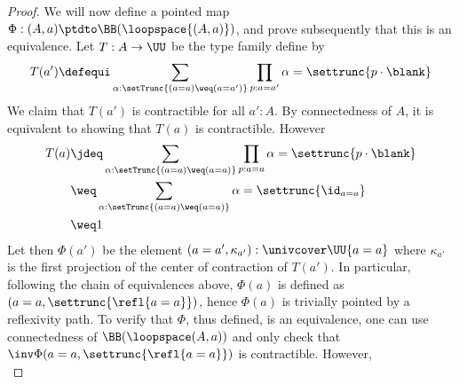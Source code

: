 \begin{proof}
  We will now define a pointed map
  $\Phi : (A,a) \ptdto \BB (\loopspace {(A,a)})$, and prove
  subsequently that this is an equivalence. Let $T : A \to \UU$ be the
  type family define by
  \begin{displaymath}
    T(a') \defequi \sum_{\alpha:\setTrunc{(a=a)\weq(a=a')}}
    \prod_{p:a=a'}\alpha=\settrunc {p\cdot\blank}
  \end{displaymath}
  We claim that $T(a')$ is contractible for all $a':A$. By
  connectedness of $A$, it is equivalent to showing that $T(a)$ is
  contractible. However
  \begin{align*}
    T(a)
    &\jdeq \sum_{\alpha:\setTrunc{(a=a)\weq(a=a)}}\prod_{p:a=a}
      \alpha = \settrunc {p\cdot \blank}
    \\
    &\weq \sum_{\alpha:\setTrunc{(a=a)\weq(a=a)}} \alpha = \settrunc{\id_{a=a}}
    \\
    &\weq 1
  \end{align*}
  Let then $\Phi (a')$ be the element
  $(a=a', \kappa_{a'}):\univcover \UU {a=a}$ where $\kappa_{a'}$ is
  the first projection of the center of contraction of $T(a')$. In
  particular, following the chain of equivalences above, $\Phi(a)$ is
  defined as $(a=a, \settrunc{\refl {a=a}})$, hence $\Phi(a)$ is
  trivially pointed by a reflexivity path. To verify that $\Phi$, thus
  defined, is an equivalence, one can use connectedness of
  $\BB(\loopspace (A,a))$ and only check that
  $\inv\Phi(a=a,\settrunc{\refl {a=a}})$ is contractible. However,
  \begin{displaymath}

\end{displaymath}
\end{proof}
